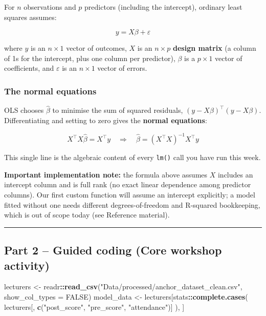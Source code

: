 \documentclass[11pt]{article}
\newenvironment{Shaded}{\begin{snugshade}}{\end{snugshade}}
\newcommand{\AttributeTok}[1]{\textcolor[rgb]{0.13,0.29,0.53}{#1}}
\newcommand{\ConstantTok}[1]{\textcolor[rgb]{0.56,0.35,0.01}{#1}}
\newcommand{\FunctionTok}[1]{\textcolor[rgb]{0.13,0.29,0.53}{\textbf{#1}}}
\newcommand{\NormalTok}[1]{#1}
\newcommand{\OtherTok}[1]{\textcolor[rgb]{0.56,0.35,0.01}{#1}}
\newcommand{\SpecialCharTok}[1]{\textcolor[rgb]{0.81,0.36,0.00}{\textbf{#1}}}
\newcommand{\StringTok}[1]{\textcolor[rgb]{0.31,0.60,0.02}{#1}}
\begin{document}
For \(n\) observations and \(p\) predictors (including the intercept),
ordinary least squares assumes:

\[y = X\beta + \varepsilon\]

where \(y\) is an \(n \times 1\) vector of outcomes, \(X\) is an
\(n \times p\) \textbf{design matrix} (a column of 1s for the intercept,
plus one column per predictor), \(\beta\) is a \(p \times 1\) vector of
coefficients, and \(\varepsilon\) is an \(n \times 1\) vector of errors.

\hypertarget{the-normal-equations}{%
\subsubsection{The normal equations}\label{the-normal-equations}}

OLS chooses \(\hat\beta\) to minimise the sum of squared residuals,
\((y - X\beta)^\top(y - X\beta)\). Differentiating and setting to zero
gives the \textbf{normal equations}:

\[X^\top X \hat\beta = X^\top y \quad\Longrightarrow\quad \hat\beta = (X^\top X)^{-1} X^\top y\]

This single line is the algebraic content of every \texttt{lm()} call
you have run this week.

\textbf{Important implementation note:} the formula above assumes \(X\)
includes an intercept column and is full rank (no exact linear
dependence among predictor columns). Our first custom function will
assume an intercept explicitly; a model fitted without one needs
different degrees-of-freedom and R-squared bookkeeping, which is out of
scope today (see Reference material).

\begin{center}\rule{0.5\linewidth}{0.5pt}\end{center}

\hypertarget{part-2-guided-coding-core-workshop-activity}{%
\subsection{Part 2 -- Guided coding (Core workshop
activity)}\label{part-2-guided-coding-core-workshop-activity}}

\begin{Shaded}
\begin{Highlighting}[]
\NormalTok{lecturers }\OtherTok{\textless{}{-}}\NormalTok{ readr}\SpecialCharTok{::}\FunctionTok{read\_csv}\NormalTok{(}\StringTok{"Data/processed/anchor\_dataset\_clean.csv"}\NormalTok{, }\AttributeTok{show\_col\_types =} \ConstantTok{FALSE}\NormalTok{)}
\NormalTok{model\_data }\OtherTok{\textless{}{-}}\NormalTok{ lecturers[stats}\SpecialCharTok{::}\FunctionTok{complete.cases}\NormalTok{(}
\NormalTok{  lecturers[, }\FunctionTok{c}\NormalTok{(}\StringTok{"post\_score"}\NormalTok{, }\StringTok{"pre\_score"}\NormalTok{, }\StringTok{"attendance"}\NormalTok{)]}
\NormalTok{), ]}
\end{Highlighting}
\end{Shaded}
\end{document}
